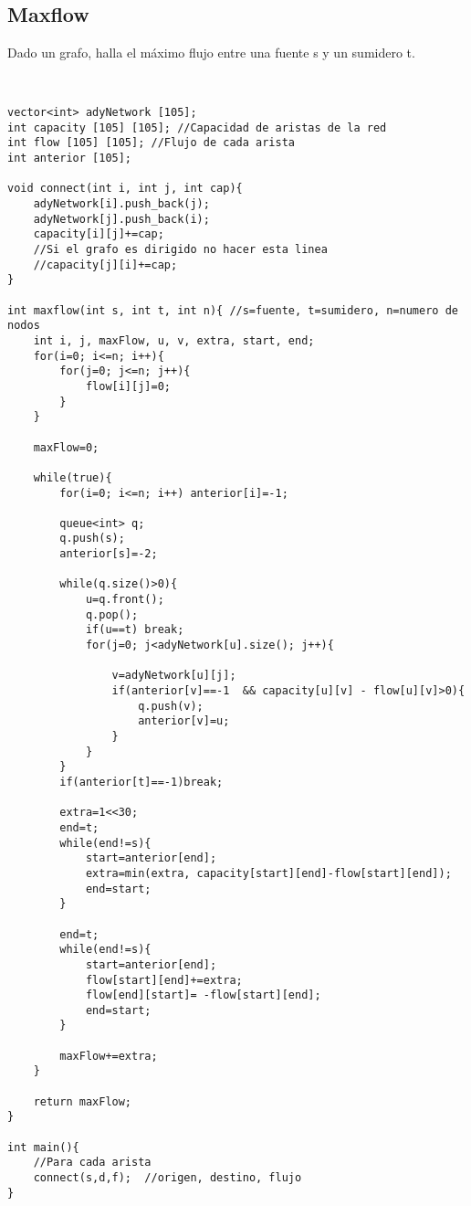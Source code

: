 \documentclass[11pt,letterpaper,twocolumn,twosided]{article}
\begin{document}
\subsection{Maxflow}
Dado un grafo, halla el m\'aximo flujo entre una fuente s y un sumidero t.
\begin{lstlisting}


vector<int> adyNetwork [105]; 
int capacity [105] [105]; //Capacidad de aristas de la red
int flow [105] [105]; //Flujo de cada arista
int anterior [105];

void connect(int i, int j, int cap){
    adyNetwork[i].push_back(j);
    adyNetwork[j].push_back(i);
    capacity[i][j]+=cap;
    //Si el grafo es dirigido no hacer esta linea
    //capacity[j][i]+=cap;
}

int maxflow(int s, int t, int n){ //s=fuente, t=sumidero, n=numero de nodos
    int i, j, maxFlow, u, v, extra, start, end;
    for(i=0; i<=n; i++){
        for(j=0; j<=n; j++){
            flow[i][j]=0;
        }
    }

    maxFlow=0;

    while(true){
        for(i=0; i<=n; i++) anterior[i]=-1;

        queue<int> q;
        q.push(s);
        anterior[s]=-2;

        while(q.size()>0){
            u=q.front();
            q.pop();
            if(u==t) break;
            for(j=0; j<adyNetwork[u].size(); j++){
                
                v=adyNetwork[u][j];
                if(anterior[v]==-1  && capacity[u][v] - flow[u][v]>0){
                    q.push(v);
                    anterior[v]=u;
                }
            }
        }
        if(anterior[t]==-1)break;

        extra=1<<30;
        end=t;
        while(end!=s){
            start=anterior[end];
            extra=min(extra, capacity[start][end]-flow[start][end]);
            end=start;
        }

        end=t;
        while(end!=s){
            start=anterior[end];
            flow[start][end]+=extra;
            flow[end][start]= -flow[start][end];
            end=start;
        }

        maxFlow+=extra;
    }

    return maxFlow;
}

int main(){
    //Para cada arista
    connect(s,d,f);  //origen, destino, flujo
}

\end{lstlisting}
\end{document}
